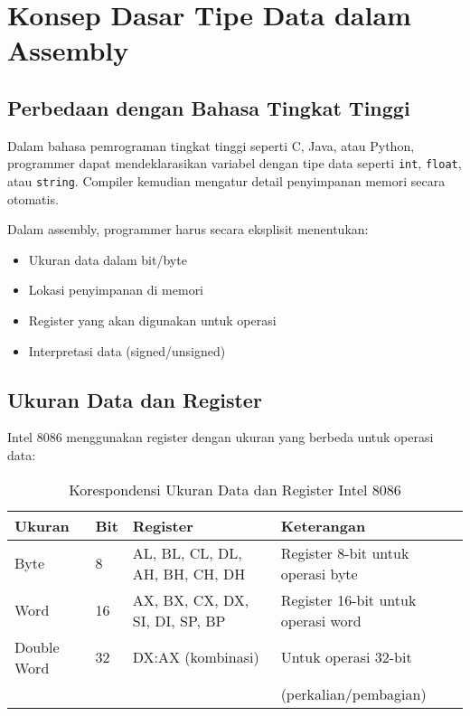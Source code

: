 \documentclass[../main.tex]{subfiles}
\begin{document}
\section{Konsep Dasar Tipe Data dalam Assembly}

\subsection{Perbedaan dengan Bahasa Tingkat Tinggi}
Dalam bahasa pemrograman tingkat tinggi seperti C, Java, atau Python, programmer dapat mendeklarasikan variabel dengan tipe data seperti \texttt{int}, \texttt{float}, atau \texttt{string}. Compiler kemudian mengatur detail penyimpanan memori secara otomatis.

Dalam assembly, programmer harus secara eksplisit menentukan:
\begin{itemize}
    \item Ukuran data dalam bit/byte
    \item Lokasi penyimpanan di memori
    \item Register yang akan digunakan untuk operasi
    \item Interpretasi data (signed/unsigned)
\end{itemize}

\subsection{Ukuran Data dan Register}
Intel 8086 menggunakan register dengan ukuran yang berbeda untuk operasi data:

\begin{table}[H]
    \centering
    \caption{Korespondensi Ukuran Data dan Register Intel 8086}
    \begin{tabular}{|p{2cm}|p{2cm}|p{3cm}|p{6cm}|}
        \hline
        \textbf{Ukuran} & \textbf{Bit} & \textbf{Register} & \textbf{Keterangan} \\
        \hline
        Byte & 8 & AL, BL, CL, DL, AH, BH, CH, DH & Register 8-bit untuk operasi byte \\
        \hline
        Word & 16 & AX, BX, CX, DX, SI, DI, SP, BP & Register 16-bit untuk operasi word \\
        \hline
        Double Word & 32 & DX:AX (kombinasi) & Untuk operasi 32-bit \\
        & & & (perkalian/pembagian) \\
        \hline
    \end{tabular}
    \label{tab:data-size-registers}
\end{table}
\end{document}
